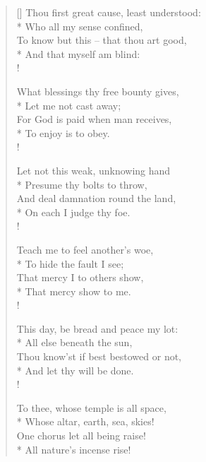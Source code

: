\documentclass[MAIN]{subfiles}
\begin{document}
\settowidth{\versewidth}{Thou first great cause, least understood:}
\begin{verse}[\versewidth]
Thou first great cause, least understood:\\* 
\vin Who all my sense confined,\\
To know but this -- that thou art good,\\*
\vin And that myself am blind:\\!

What blessings thy free bounty gives,\\*
\vin Let me not cast away;\\
For God is paid when man receives,\\*
\vin To enjoy is to obey.\\!

Let not this weak, unknowing hand\\*
\vin Presume thy bolts to throw,\\
And deal damnation round the land,\\*
\vin On each I judge thy foe.\\!

Teach me to feel another's woe,\\*
\vin To hide the fault I see;\\
That mercy I to others show,\\*
\vin That mercy show to me.\\!

This day, be bread and peace my lot:\\*
\vin All else beneath the sun,\\
Thou know’st if best bestowed or not,\\*
\vin And let thy will be done.\\!

To thee, whose temple is all space,\\*
\vin Whose altar, earth, sea, skies!\\
One chorus let all being raise!\\*
\vin All nature's incense rise!
\end{verse}
\end{document}
